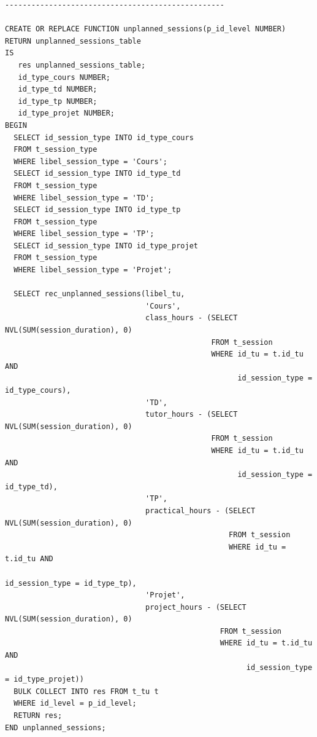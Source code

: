 \documentclass{article}
\begin{document}
\begin{verbatim}
--------------------------------------------------

CREATE OR REPLACE FUNCTION unplanned_sessions(p_id_level NUMBER)
RETURN unplanned_sessions_table
IS
   res unplanned_sessions_table;
   id_type_cours NUMBER;
   id_type_td NUMBER;
   id_type_tp NUMBER;
   id_type_projet NUMBER;
BEGIN
  SELECT id_session_type INTO id_type_cours
  FROM t_session_type
  WHERE libel_session_type = 'Cours';
  SELECT id_session_type INTO id_type_td
  FROM t_session_type
  WHERE libel_session_type = 'TD';
  SELECT id_session_type INTO id_type_tp
  FROM t_session_type
  WHERE libel_session_type = 'TP';
  SELECT id_session_type INTO id_type_projet
  FROM t_session_type
  WHERE libel_session_type = 'Projet';
  
  SELECT rec_unplanned_sessions(libel_tu,
                                'Cours',
                                class_hours - (SELECT NVL(SUM(session_duration), 0)
                                               FROM t_session
                                               WHERE id_tu = t.id_tu AND
                                                     id_session_type = id_type_cours),
                                'TD',              
                                tutor_hours - (SELECT NVL(SUM(session_duration), 0)
                                               FROM t_session
                                               WHERE id_tu = t.id_tu AND
                                                     id_session_type = id_type_td),
                                'TP',              
                                practical_hours - (SELECT NVL(SUM(session_duration), 0)
                                                   FROM t_session
                                                   WHERE id_tu = t.id_tu AND
                                                         id_session_type = id_type_tp),
                                'Projet',              
                                project_hours - (SELECT NVL(SUM(session_duration), 0)
                                                 FROM t_session
                                                 WHERE id_tu = t.id_tu AND
                                                       id_session_type = id_type_projet))
  BULK COLLECT INTO res FROM t_tu t
  WHERE id_level = p_id_level;
  RETURN res;
END unplanned_sessions;
\end{verbatim}
\end{document}
